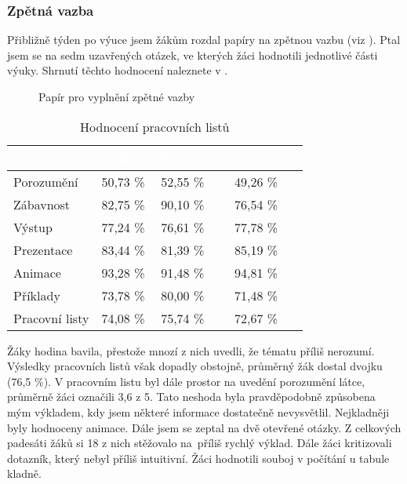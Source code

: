\subsubsection{Zpětná vazba}
{Přibližně týden po výuce jsem žákům rozdal papíry na zpětnou vazbu (viz ). Ptal jsem se na sedm uzavřených otázek, ve kterých žáci hodnotili jednotlivé části výuky. Shrnutí těchto hodnocení naleznete v .}\\
\begin{minipage}{0.35\textwidth}
    \begin{figure}[H]
        \centering
        \setlength{\fboxsep}{0pt}
        \caption{Papír pro vyplnění zpětné vazby \jaObr}
        \label{obr:papirZpetnaVazba}
    \end{figure}
\end{minipage}\hfill
\begin{minipage}{0.6\textwidth}
    \renewcommand{\arraystretch}{1.25}
    \begin{table}[H]
        \begin{tabular}{|p{2.5cm}|p{1.7cm}|p{1.7cm}|p{1.7cm}|}
            \hline
            \rowcolor{black!60}
            \textcolor{white}{Název části} & \textcolor{white}{Celkem} & \textcolor{white}{Třída 2.B} & \textcolor{white}{Třída 2.A}\\
            \hline
            Porozumění & \hfill 50,73 \% & \hfill 52,55 \% & \hfill 49,26 \% \\
            \hline
            Zábavnost & \hfill 82,75 \% & \hfill 90,10 \% & \hfill 76,54 \% \\
            \hline
            Výstup & \hfill 77,24 \% & \hfill 76,61 \% & \hfill 77,78 \% \\
            \hline
            Prezentace & \hfill 83,44 \% & \hfill 81,39 \% & \hfill 85,19 \% \\
            \hline
            Animace & \hfill 93,28 \% & \hfill 91,48 \% & \hfill 94,81 \% \\
            \hline
            Příklady & \hfill 73,78 \% & \hfill 80,00 \% & \hfill 71,48 \% \\
            \hline
            Pracovní listy & \hfill 74,08 \% & \hfill 75,74 \% & \hfill 72,67 \% \\
            \hline
        \end{tabular}
        \caption{Hodnocení pracovních listů \jaTab}
        \label{tab:zpetnaVazba}
    \end{table}
\end{minipage}\odst
{Žáky hodina bavila, přestože mnozí z nich uvedli, že tématu příliš nerozumí. Výsledky pracovních listů však dopadly obstojně, průměrný žák dostal dvojku (76,5 \%). V pracovním listu byl dále prostor na uvedění porozumění látce, průměrně žáci označili 3,6 z 5. Tato neshoda byla pravděpodobně způsobena mým výkladem, kdy jsem některé informace dostatečně nevysvětlil. Nejkladněji byly hodnoceny animace.}\odst
{Dále jsem se zeptal na dvě otevřené otázky. Z celkových padesáti žáků si 18 z nich stěžovalo na~příliš rychlý výklad. Dále žáci kritizovali dotazník, který nebyl příliš intuitivní. Žáci hodnotili souboj v počítání u tabule kladně.}\odst